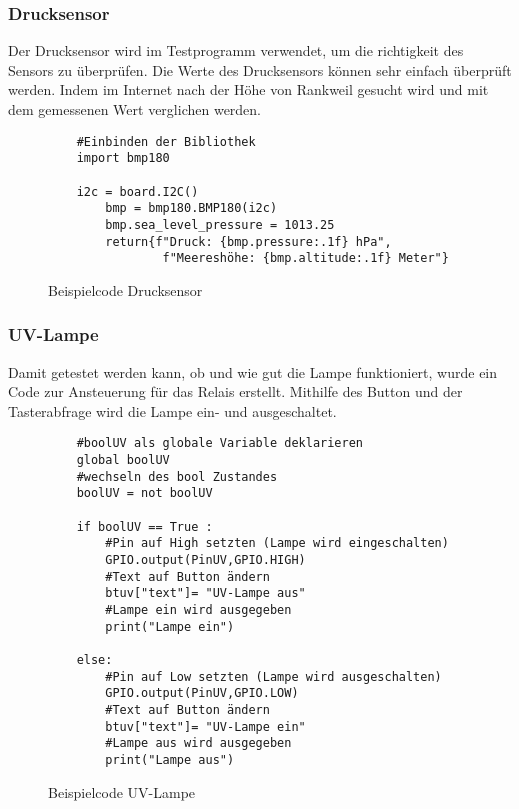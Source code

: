 \subsubsection{Drucksensor}\label{sec:Testprogramm Drucksensor}
Der Drucksensor wird im Testprogramm verwendet, um die richtigkeit des Sensors zu überprüfen. Die Werte des Drucksensors können sehr einfach überprüft werden. Indem im Internet nach der Höhe von Rankweil gesucht wird und mit dem gemessenen Wert verglichen werden. 
\begin{figure}[H]
    \centering
    \begin{verbatim}
    #Einbinden der Bibliothek
    import bmp180
    
    i2c = board.I2C()
        bmp = bmp180.BMP180(i2c)
        bmp.sea_level_pressure = 1013.25
        return{f"Druck: {bmp.pressure:.1f} hPa", 
                f"Meereshöhe: {bmp.altitude:.1f} Meter"}
    \end{verbatim}
    \caption{Beispielcode Drucksensor}
\end{figure}

\newpage
\subsubsection{UV-Lampe}\label{sec:Testprogramm UV-Lampe}
Damit getestet werden kann, ob und wie gut die Lampe funktioniert, wurde ein Code zur Ansteuerung für das Relais erstellt. Mithilfe des Button und der Tasterabfrage wird die Lampe ein- und ausgeschaltet. 
\begin{figure}[H]
    \centering
    \begin{verbatim}
    #boolUV als globale Variable deklarieren
    global boolUV
    #wechseln des bool Zustandes
    boolUV = not boolUV

    if boolUV == True :
        #Pin auf High setzten (Lampe wird eingeschalten)
        GPIO.output(PinUV,GPIO.HIGH)
        #Text auf Button ändern
        btuv["text"]= "UV-Lampe aus" 
        #Lampe ein wird ausgegeben
        print("Lampe ein")
        
    else:
        #Pin auf Low setzten (Lampe wird ausgeschalten)
        GPIO.output(PinUV,GPIO.LOW)
        #Text auf Button ändern
        btuv["text"]= "UV-Lampe ein"
        #Lampe aus wird ausgegeben
        print("Lampe aus") 
    \end{verbatim}
    \caption{Beispielcode UV-Lampe}
\end{figure}

\newpage
\SecAuth{\nameJS}
